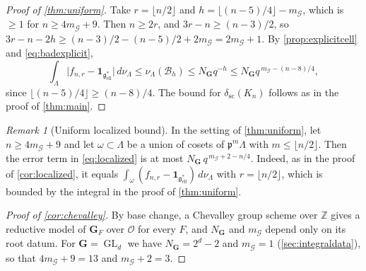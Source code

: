 \documentclass[11pt,reqno]{amsart}
\numberwithin{equation}{section}
\theoremstyle{plain}
\theoremstyle{definition}
\theoremstyle{remark}
\newtheorem{remark}[theorem]{Remark}
\theoremstyle{plain}
\newcommand{\Z}{\mathbb{Z}}      %
\newcommand{\OO}{\mathcal{O}}    %
\newcommand{\pp}{\mathfrak{p}}   %
\newcommand{\Lat}{\mathcal{L}}   %
\newcommand{\dLat}{\Lambda}      %
\newcommand{\bG}{\mathbf{G}}     %
\newcommand{\g}{\mathfrak{g}}    %
\newcommand{\gd}{\mathfrak{g}^*} %
\newcommand{\Ell}[2][]{#2_{#1\mathrm{ell}}}   %
\newcommand{\scd}[1]{\delta_{\mathrm{sc}}(#1)}
\newcommand{\Bad}{\mathcal{B}}   %
\newcommand{\Pcss}{\mathscr{P}^{\mathrm{ss}}_{\mathrm{max}}}  %
\newcommand{\Nss}{N_{\bG}}  %
\newcommand{\cG}{\mathcal{G}}                   %
\newcommand{\one}{\mathbf{1}}
\newcommand{\abs}[1]{\lvert#1\rvert}
\DeclareMathOperator{\GL}{GL}
\newcommand{\cell}{\omega}
\begin{document}
\begin{proof}[Proof of \cref{thm:uniform}]
Take $r=\lfloor n/2\rfloor$ and $h=\lfloor(n-5)/4\rfloor-m_{\cG}$, which is
$\ge1$ for $n\ge4m_{\cG}+9$. Then $n\ge2r$, and $3r-n\ge(n-3)/2$, so
$3r-n-2h\ge(n-3)/2-(n-5)/2+2m_{\cG}=2m_{\cG}+1$. By \cref{prop:explicitcell}
and \eqref{eq:badexplicit},
\[
\int_\dLat\abs{f_{n,r}-\one_{\Ell{\gd}}}\,d\nu_{\dLat}\le\nu_{\dLat}(\Bad_h)\le \Nss q^{-h}
\le \Nss q^{\,m_{\cG}-(n-8)/4},
\]
since $\lfloor(n-5)/4\rfloor\ge(n-8)/4$. The bound for $\scd{K_n}$ follows as
in the proof of \cref{thm:main}.
\end{proof}

\begin{remark}[Uniform localized bound]\label{rem:uniformlocalized}
In the setting of \cref{thm:uniform}, let $n\ge4m_{\cG}+9$ and let
$\cell\subset\dLat$ be a union of cosets of $\pp^m\dLat$ with
$m\le\lfloor n/2\rfloor$. Then the error term in \eqref{eq:localized} is at
most $\Nss\,q^{\,m_{\cG}+2-n/4}$. Indeed, as in the proof of
\cref{cor:localized}, it equals
$\int_\cell(f_{n,r}-\one_{\Ell{\gd}})\,d\nu_{\dLat}$ with
$r=\lfloor n/2\rfloor$, which is bounded by the integral in the proof of
\cref{thm:uniform}.
\end{remark}

\begin{proof}[Proof of \cref{cor:chevalley}]
By base change, a Chevalley group scheme over $\Z$ gives a reductive model of
$\bG_F$ over $\OO$ for every $F$, and $\Nss$ and $m_{\cG}$ depend only on its
root datum. For $\bG=\GL_d$ we have $\Nss=2^d-2$ and $m_{\cG}=1$
(\cref{sec:integraldata}), so that $4m_{\cG}+9=13$ and $m_{\cG}+2=3$.
\end{proof}
\end{document}

